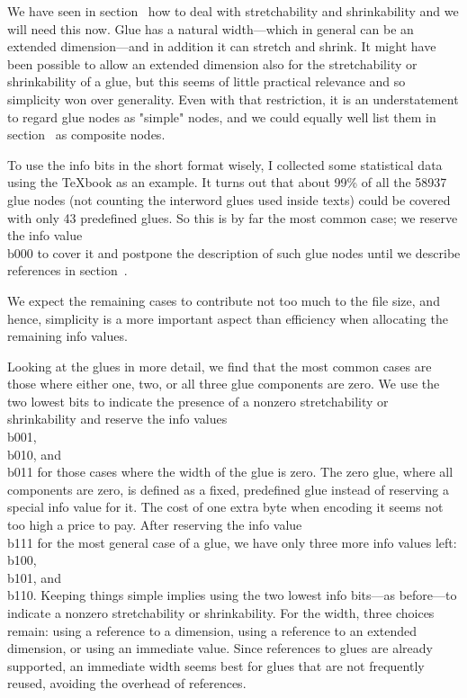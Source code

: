 

We have seen in section~ how to deal with
stretchability and
shrinkability and we will need this now.
Glue has a natural width---which in general can be an
extended dimension---and in addition it can stretch and shrink.  It
might have been possible to allow an extended dimension also for the
stretch\-ability or shrink\-ability of a glue, but this seems of
little practical relevance and so simplicity won over generality.
Even with that restriction, it is an understatement to regard glue
nodes as "simple" nodes, and we could equally well list them in
section~ as composite nodes.

To use the info bits in the short format wisely, I collected some
statistical data using the \TeX book as an example. It turns out that
about 99\% of all the 58937 glue nodes (not counting the interword
glues used inside texts) could be covered with only 43 predefined
glues.  So this is by far the most common case; we reserve the info
value \\{b000} to cover it and postpone the description of such glue
nodes until we describe references in section~.

We expect the remaining cases to contribute not too much to the file
size, and hence, simplicity is a more important aspect than efficiency
when allocating the remaining info values.

Looking at the glues in more detail, we find that the most common
cases are those where either one, two, or all three glue components
are zero. We use the two lowest bits to indicate the presence of a
nonzero stretchability or shrinkability and reserve the info values
\\{b001}, \\{b010}, and \\{b011} for those cases where the width of the glue
is zero.  The zero glue, where all components are zero, is defined as
a fixed, predefined glue instead of reserving a special info value for
it.  The cost of one extra byte when encoding it seems not too high a
price to pay.  After reserving the info value \\{b111} for the most
general case of a glue, we have only three more info values left:
\\{b100}, \\{b101}, and \\{b110}.  Keeping things simple implies using the
two lowest info bits---as before---to indicate a nonzero
stretchability or shrinkability. For the width, three choices remain:
using a reference to a dimension, using a reference to an extended
dimension, or using an immediate value.  Since references to glues are
already supported, an immediate width seems best for glues that are
not frequently reused, avoiding the overhead of references.

